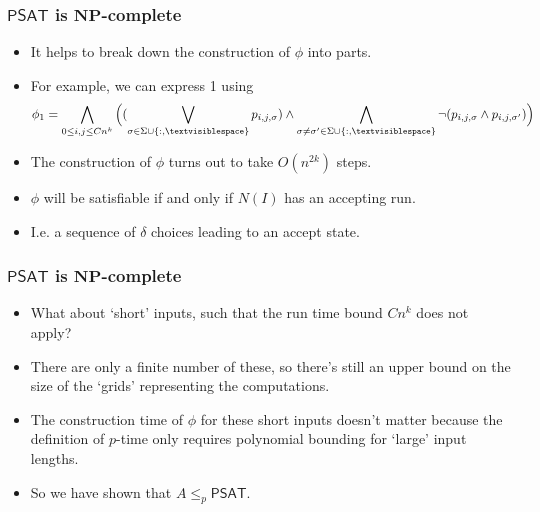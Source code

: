 \documentclass[handout]{beamer}
\newcommand{\tvs}{\textvisiblespace}
\newcommand{\NP}{\mathbf{NP}}
\newcommand{\SAT}{\mathsf{PSAT}}
\begin{document}
\begin{frame}
\frametitle{$\SAT$ is $\NP$-complete}
\begin{itemize}
\item It helps to break down the construction of $\phi$ into parts. 
\vspace{0.5cm}
\item For example, we can express 1 using
\[\phi_1=\bigwedge_{0\leq i,j\leq Cn^k}\Big((\bigvee_{\sigma\in\Sigma\cup\{:,\tvs\}}p_{i,j,\sigma})\wedge \bigwedge_{\sigma\neq\sigma'\in\Sigma\cup\{:,\tvs\}}\neg (p_{i,j,\sigma}\wedge p_{i,j,\sigma'})\Big)\]
\item The construction of $\phi$ turns out to take $O(n^{2k})$ steps. 
\vspace{0.5cm}
\item  $\phi$ will be satisfiable if and only if $N(I)$ has an accepting run.
\vspace{0.5cm}
\item  I.e. a sequence of $\delta$ choices leading to an accept state. 
\end{itemize} 
\end{frame}

\begin{frame}
\frametitle{$\SAT$ is $\NP$-complete}
\begin{itemize}
\item What about `short' inputs, such that the run time bound $Cn^k$ does not apply? 
\vspace{0.5cm}
\item There are only a finite number of these, so there's still an upper bound on the size of the `grids' representing the computations. 
\vspace{0.5cm}
\item The construction time of $\phi$ for these short inputs doesn't matter because the definition of $p$-time only requires polynomial bounding for `large' input lengths.
\vspace{0.5cm}
\item So we have shown that $A\leq_p\SAT$.
\end{itemize} 
\end{frame}
\end{document}
